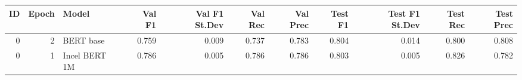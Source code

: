\begin{tabular}{rrlrrrrrrrr}
\toprule
 ID &  Epoch &         Model &  Val F1 &  Val F1 St.Dev &  Val Rec &  Val Prec &  Test F1 &  Test F1 St.Dev &  Test Rec &  Test Prec \\
\midrule
  0 &      2 &     BERT base &   0.759 &          0.009 &    0.737 &     0.783 &    0.804 &           0.014 &     0.800 &      0.808 \\
  0 &      1 & Incel BERT 1M &   0.786 &          0.005 &    0.786 &     0.786 &    0.803 &           0.005 &     0.826 &      0.782 \\
\bottomrule
\end{tabular}
